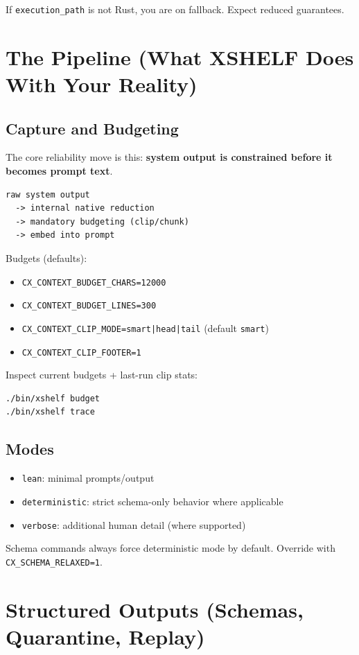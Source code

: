 \documentclass[11pt]{article}
\begin{document}
If \texttt{execution\_path} is not Rust, you are on fallback. Expect reduced guarantees.

\section{The Pipeline (What XSHELF Does With Your Reality)}
\subsection{Capture and Budgeting}
The core reliability move is this: \textbf{system output is constrained before it becomes prompt text}.

\begin{lstlisting}[style=cx]
raw system output
  -> internal native reduction
  -> mandatory budgeting (clip/chunk)
  -> embed into prompt
\end{lstlisting}

Budgets (defaults):
\begin{itemize}
  \item \texttt{CX\_CONTEXT\_BUDGET\_CHARS=12000}
  \item \texttt{CX\_CONTEXT\_BUDGET\_LINES=300}
  \item \texttt{CX\_CONTEXT\_CLIP\_MODE=smart|head|tail} (default \texttt{smart})
  \item \texttt{CX\_CONTEXT\_CLIP\_FOOTER=1}
\end{itemize}

Inspect current budgets + last-run clip stats:
\begin{lstlisting}[style=cx]
./bin/xshelf budget
./bin/xshelf trace
\end{lstlisting}

\subsection{Modes}
\begin{itemize}
  \item \texttt{lean}: minimal prompts/output
  \item \texttt{deterministic}: strict schema-only behavior where applicable
  \item \texttt{verbose}: additional human detail (where supported)
\end{itemize}

Schema commands always force deterministic mode by default. Override with \texttt{CX\_SCHEMA\_RELAXED=1}.

\section{Structured Outputs (Schemas, Quarantine, Replay)}
\end{document}
